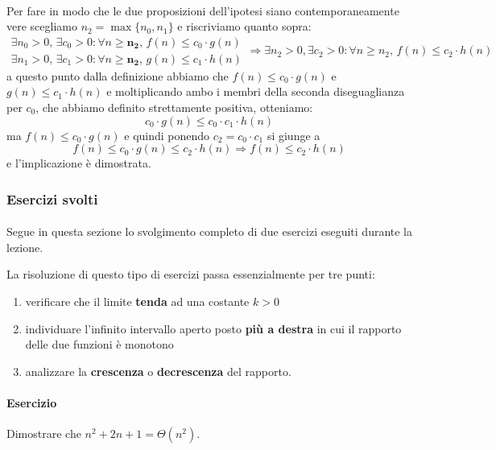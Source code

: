 \documentclass[11pt,a4paper,oneside]{article}
\begin{document}
\paragraph*{}Per fare in modo che le due proposizioni dell'ipotesi siano contemporaneamente vere scegliamo $n_2 = \max\{n_0, n_1\}$ e riscriviamo quanto sopra:
\[
\begin{array}{l}
\exists n_0 > 0,\, \exists c_0 > 0: \forall n \geq \bm{n_2},\,f(n) \leq c_0\cdot g(n) \\
\exists n_1 > 0,\, \exists c_1 > 0: \forall n \geq \bm{n_2},\,g(n) \leq c_1\cdot h(n) 
\end{array} \Rightarrow \exists n_2 > 0, \exists c_2 > 0 : \forall n \geq n_2,\,f(n) \leq c_2\cdot h(n)
\]
a questo punto dalla definizione abbiamo che $f(n) \leq c_0\cdot g(n)$ e $g(n) \leq c_1\cdot h(n)$ e moltiplicando ambo i membri della seconda diseguaglianza per $c_0$, che abbiamo definito strettamente positiva, otteniamo: $$c_0\cdot g(n) \leq c_0 \cdot c_1 \cdot h(n)$$ ma $f(n) \leq c_0\cdot g(n)$ e quindi ponendo $c_2 = c_0 \cdot c_1$ si giunge a $$f(n) \leq c_0\cdot g(n)\leq c_2 \cdot h(n) \Rightarrow f(n) \leq c_2\cdot h(n)$$ e l'implicazione è dimostrata.
\pagebreak
\subsubsection{Esercizi svolti}
\paragraph*{} Segue in questa sezione lo svolgimento completo di due esercizi eseguiti durante la lezione.\\

\begin{tcolorbox}[title=Ricorda che...]
	\label{tbox:solving}
	La risoluzione di questo tipo di esercizi passa essenzialmente per tre punti:
	\begin{enumerate}
		\item verificare che il limite \textbf{tenda} ad una costante $k > 0$
		\item individuare l'infinito intervallo aperto posto \textbf{più a destra} in cui il rapporto delle due funzioni è monotono
		\item analizzare la \textbf{crescenza} o \textbf{decrescenza} del rapporto.
	\end{enumerate}
\end{tcolorbox}


\paragraph*{Esercizio} Dimostrare che $n^2+2n+1 = \Theta(n^2)$.
\end{document}
